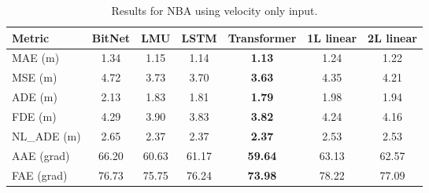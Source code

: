 \begin{table}[H]
\centering
\caption{Results for NBA  using velocity only input.}
\label{vel:NBA1}
\begin{tabular}{l||c|c|c|c|c|c}
Metric & BitNet & LMU & LSTM & Transformer & 1L linear & 2L linear \\
\hline \hline
MAE (m) & 1.34 & 1.15 & 1.14 & \textbf{1.13} & 1.24 & 1.22\\
MSE (m) & 4.72 & 3.73 & 3.70 & \textbf{3.63} & 4.35 & 4.21 \\
ADE (m) & 2.13 & 1.83 & 1.81 & \textbf{1.79} & 1.98 & 1.94 \\
FDE (m) & 4.29 & 3.90  & 3.83 & \textbf{3.82} & 4.24 & 4.16 \\
NL\_ADE (m) & 2.65 & 2.37 & 2.37 & \textbf{2.37} & 2.53 & 2.53 \\
AAE (grad) & 66.20 & 60.63 & 61.17 & \textbf{59.64} & 63.13 & 62.57 \\
FAE (grad) & 76.73 & 75.75 & 76.24 & \textbf{73.98} & 78.22 & 77.09 \\

\end{tabular}
\end{table}